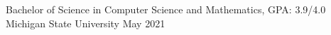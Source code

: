 
\begin{cventries}
  \cventry
    {Bachelor of Science in Computer Science and Mathematics, GPA: 3.9/4.0} %
    {Michigan State University} %
    {} %
    {May 2021} %
    {
    }
\end{cventries}